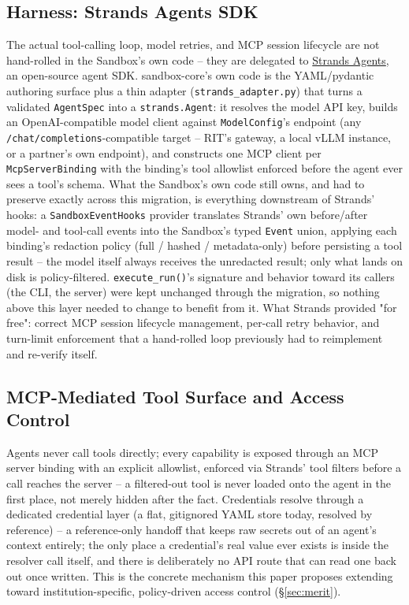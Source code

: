\documentclass[10pt,conference]{IEEEtran}
\begin{document}
\subsection{Harness: Strands Agents SDK}
\label{sec:strands}
The actual tool-calling loop, model retries, and MCP session lifecycle are
not hand-rolled in the Sandbox's own code -- they are delegated to
\href{https://strandsagents.com}{Strands Agents}, an open-source agent SDK.
sandbox-core's own code is the YAML/pydantic authoring surface plus a thin
adapter (\texttt{strands\_adapter.py}) that turns a validated
\texttt{AgentSpec} into a \texttt{strands.Agent}: it resolves the model API
key, builds an OpenAI-compatible model client against \texttt{ModelConfig}'s
endpoint (any \texttt{/chat/completions}-compatible target -- RIT's gateway,
a local vLLM instance, or a partner's own endpoint), and constructs one MCP
client per \texttt{McpServerBinding} with the binding's tool allowlist
enforced before the agent ever sees a tool's schema. What the Sandbox's own
code still owns, and had to preserve exactly across this migration, is
everything downstream of Strands' hooks: a \texttt{SandboxEventHooks}
provider translates Strands' own before/after model- and tool-call events
into the Sandbox's typed \texttt{Event} union, applying each binding's
redaction policy (full / hashed / metadata-only) before persisting a tool
result -- the model itself always receives the unredacted result; only what
lands on disk is policy-filtered. \texttt{execute\_run()}'s signature and
behavior toward its callers (the CLI, the server) were kept unchanged
through the migration, so nothing above this layer needed to change to
benefit from it. What Strands provided "for free": correct MCP session
lifecycle management, per-call retry behavior, and turn-limit enforcement
that a hand-rolled loop previously had to reimplement and re-verify itself.

\subsection{MCP-Mediated Tool Surface and Access Control}
Agents never call tools directly; every capability is exposed through an MCP
server binding with an explicit allowlist, enforced via Strands' tool
filters before a call reaches the server -- a filtered-out tool is never
loaded onto the agent in the first place, not merely hidden after the fact.
Credentials resolve through a dedicated credential layer (a flat, gitignored
YAML store today, resolved by reference) -- a reference-only handoff that
keeps raw secrets out of an agent's context entirely; the only place a
credential's real value ever exists is inside the resolver call itself, and
there is deliberately no API route that can read one back out once written.
This is the concrete mechanism this paper proposes extending toward
institution-specific, policy-driven access control (\S\ref{sec:merit}).
\end{document}
